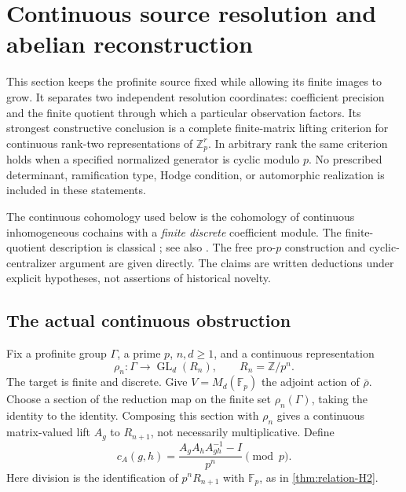 \section{Continuous source resolution and abelian reconstruction}\label{sec:profinite-reconstruction}

This section keeps the profinite source fixed while allowing its finite images to grow. It separates two independent resolution coordinates: coefficient precision and the finite quotient through which a particular observation factors. Its strongest constructive conclusion is a complete finite-matrix lifting criterion for continuous rank-two representations of $\mathbb Z_p^r$. In arbitrary rank the same criterion holds when a specified normalized generator is cyclic modulo $p$. No prescribed determinant, ramification type, Hodge condition, or automorphic realization is included in these statements.

The continuous cohomology used below is the cohomology of continuous inhomogeneous cochains with a \emph{finite discrete} coefficient module. The finite-quotient description is classical \cite[Chapter II, Section 4, Proposition 4.2]{MilneCFT2020}; see also \cite{StacksContinuous}. The free pro-$p$ construction and cyclic-centralizer argument are given directly. The claims are written deductions under explicit hypotheses, not assertions of historical novelty.

\subsection{The actual continuous obstruction}

Fix a profinite group $\Gamma$, a prime $p$, $n,d\geq1$, and a continuous representation
\[
 \rho_n:\Gamma\longrightarrow\operatorname{GL}_d(R_n),
 \qquad R_n=\mathbb Z/p^n.
\]
The target is finite and discrete. Give $V=M_d(\mathbb F_p)$ the adjoint action of $\bar\rho$. Choose a section of the reduction map on the finite set $\rho_n(\Gamma)$, taking the identity to the identity. Composing this section with $\rho_n$ gives a continuous matrix-valued lift $A_g$ to $R_{n+1}$, not necessarily multiplicative. Define
\[
 c_A(g,h)=\frac{A_gA_hA_{gh}^{-1}-I}{p^n}\pmod p.
\]
Here division is the identification of $p^nR_{n+1}$ with $\mathbb F_p$, as in \cref{thm:relation-H2}.

